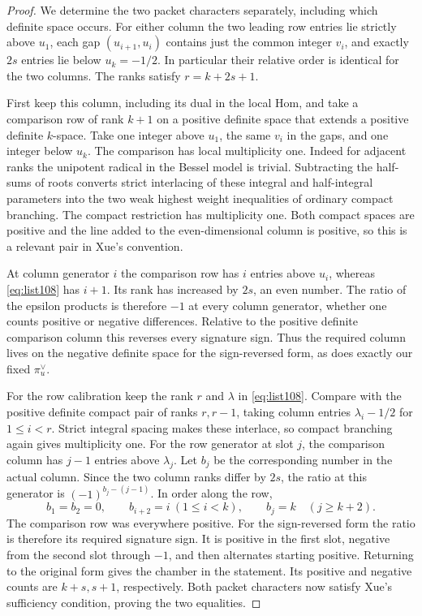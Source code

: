 \documentclass[a4paper,11pt]{article}
\theoremstyle{definition}
\theoremstyle{remark}
\numberwithin{equation}{section}
\begin{document}
\begin{proof}
We determine the two packet characters separately, including
which definite space occurs. For either column the two leading
row entries lie strictly above \(u_1\), each gap
\((u_{i+1},u_i)\) contains just the common integer \(v_i\),
and exactly \(2s\) entries lie below \(u_k=-1/2\).
In particular their relative order is identical for the two
columns. The ranks satisfy \(r=k+2s+1\).

First keep this column, including its dual in the local Hom,
and take a comparison row of rank \(k+1\) on a positive definite
space that extends a positive definite \(k\)-space. Take one
integer above \(u_1\), the same \(v_i\) in the gaps, and one
integer below \(u_k\). The comparison has local multiplicity
one. Indeed for adjacent ranks the unipotent radical in the
Bessel model is trivial. Subtracting the half-sums of roots
converts strict interlacing of these integral and half-integral
parameters into the two weak highest weight inequalities of
ordinary compact branching. The compact restriction
has multiplicity one. Both compact spaces are positive and the
line added to the even-dimensional column is positive, so this
is a relevant pair in Xue's convention.

At column generator \(i\) the comparison row has \(i\) entries
above \(u_i\), whereas \eqref{eq:list108} has \(i+1\). Its
rank has increased by \(2s\), an even number. The ratio of the
epsilon products is therefore \(-1\) at every column generator,
whether one counts positive or negative differences. Relative
to the positive definite comparison column this reverses every
signature sign. Thus the required column lives on the negative
definite space for the sign-reversed form, as does exactly our
fixed \(\pi_u^\vee\).

For the row calibration keep the rank \(r\) and \(\lambda\) in
\eqref{eq:list108}. Compare with the positive definite compact
pair of ranks \(r,r-1\), taking column entries
\(\lambda_i-1/2\) for \(1\le i<r\). Strict integral spacing
makes these interlace, so compact branching again gives
multiplicity one. For the row generator at slot \(j\), the
comparison column has \(j-1\) entries above \(\lambda_j\).
Let \(b_j\) be the corresponding number in the actual column.
Since the two column ranks differ by \(2s\), the ratio at this
generator is \((-1)^{b_j-(j-1)}\). In order along the row,
\[
 b_1=b_2=0,\qquad b_{i+2}=i\ (1\le i<k),\qquad
 b_j=k\quad(j\ge k+2).
\]
The comparison row was everywhere positive. For the sign-reversed
form the ratio is therefore its required signature sign. It is
positive in the first slot, negative from the second slot through
\(-1\), and then alternates starting positive. Returning to the
original form gives the chamber in the statement. Its positive
and negative counts are \(k+s,s+1\), respectively. Both packet
characters now satisfy Xue's sufficiency condition, proving the
two equalities.


\end{proof}
\end{document}
